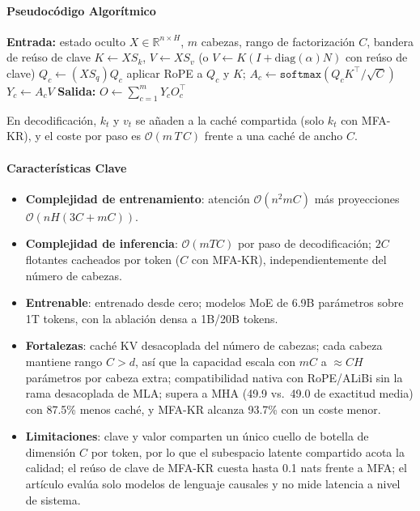 \paragraph{Pseudocódigo Algorítmico}
\begin{algorithmic}[1]
\State \textbf{Entrada:} estado oculto $X\in\mathbb{R}^{n\times H}$, $m$ cabezas, rango de factorización $C$, bandera de reúso de clave
\State $K\gets XS_k$, \quad $V\gets XS_v$ (o $V\gets K(I+\mathrm{diag}(\alpha)N)$ con reúso de clave) 
    \State $Q_c\gets (XS_q)Q_c$ 
    \State aplicar RoPE a $Q_c$ y $K$; \quad $A_c\gets\texttt{softmax}(Q_cK^{\top}/\sqrt{C})$ 
    \State $Y_c\gets A_cV$
\EndFor
\State \textbf{Salida:} $O\gets\sum_{c=1}^{m}Y_cO_c^{\top}$
\end{algorithmic}
En decodificación, $k_t$ y $v_t$ se añaden a la caché compartida (solo $k_t$ con MFA-KR), y el coste por paso es $\mathcal{O}(m\,T\,C)$ frente a una caché de ancho $C$.

\paragraph{Características Clave}
\begin{itemize}[leftmargin=*]
    \item \textbf{Complejidad de entrenamiento}: atención $\mathcal{O}(n^{2}mC)$ más proyecciones $\mathcal{O}(nH(3C+mC))$.
    \item \textbf{Complejidad de inferencia}: $\mathcal{O}(mTC)$ por paso de decodificación; $2C$ flotantes cacheados por token ($C$ con MFA-KR), independientemente del número de cabezas.
    \item \textbf{Entrenable}: entrenado desde cero; modelos MoE de 6.9B parámetros sobre 1T tokens, con la ablación densa a 1B/20B tokens.
    \item \textbf{Fortalezas}: caché KV desacoplada del número de cabezas; cada cabeza mantiene rango $C>d$, así que la capacidad escala con $mC$ a $\approx CH$ parámetros por cabeza extra; compatibilidad nativa con RoPE/ALiBi sin la rama desacoplada de MLA; supera a MHA (49.9 vs.\ 49.0 de exactitud media) con 87.5\% menos caché, y MFA-KR alcanza 93.7\% con un coste menor.
    \item \textbf{Limitaciones}: clave y valor comparten un único cuello de botella de dimensión $C$ por token, por lo que el subespacio latente compartido acota la calidad; el reúso de clave de MFA-KR cuesta hasta 0.1 nats frente a MFA; el artículo evalúa solo modelos de lenguaje causales y no mide latencia a nivel de sistema.
\end{itemize}

